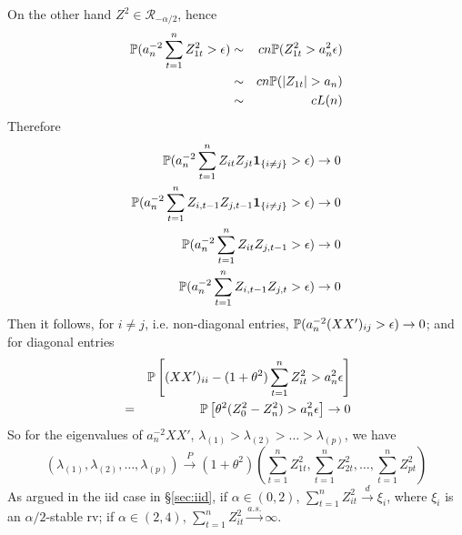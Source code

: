 \documentclass{article}
\begin{document}
On the other hand $Z^2 \in \mathcal R_{-\alpha/2}$, hence
\begin{eqnarray*}
  \mathbb{P}(a_n^{-2} \sum_{t=1}^n Z_{1t}^2 > \epsilon) &\sim& c n
  \mathbb{P}(Z_{1t}^2 > a_n^2 \epsilon) \\
  &\sim& c n \mathbb{P}(|Z_{1t}| > a_n) \\
  &\sim& c L(n)
\end{eqnarray*}
Therefore
\begin{eqnarray*}
  \mathbb{P}(a_n^{-2} \sum_{t=1}^n Z_{it} Z_{jt}\mathbf{1}_{\{i \neq j\}} > \epsilon) \to
  0 \\
  \mathbb{P}(a_n^{-2} \sum_{t=1}^n Z_{i,t-1} Z_{j,t-1} \mathbf{1}_{\{i \neq j\}} >
  \epsilon) \to 0 \\
  \mathbb{P}(a_n^{-2} \sum_{t=1}^n Z_{it} Z_{j,t-1} > \epsilon) \to 0
  \\
  \mathbb{P}(a_n^{-2} \sum_{t=1}^n Z_{i, t-1} Z_{j,t} > \epsilon) \to 0
\end{eqnarray*}
Then it follows, for $i \neq j$, i.e. non-diagonal entries,
$\mathbb{P}(a_n^{-2} (XX')_{ij} > \epsilon) \to 0$; and for diagonal entries
\begin{eqnarray*}
  && \mathbb{P}\left[(XX')_{ii} - (1 + \theta^2)\sum_{t=1}^n
      Z_{it}^2 > a_n^{2} \epsilon \right] \\
  &=& \mathbb{P}\left[\theta^2 ( Z_{0}^2-Z_{n}^2) > a_n^{2} \epsilon
  \right] \to 0\\
\end{eqnarray*}
So for the eigenvalues of $a_n^{-2}XX'$, $\lambda_{(1)} > \lambda_{(2)} >
\dots > \lambda_{(p)}$, we have
\[
(\lambda_{(1)}, \lambda_{(2)}, \dots, \lambda_{(p)}) \xrightarrow{P}
(1+\theta^2)(\sum_{t=1}^n Z_{1t}^2, \sum_{t=1}^n Z_{2t}^2, \dots,
\sum_{t=1}^n Z_{pt}^2)
\]
As argued in the iid case in \S\ref{sec:iid}, if $\alpha \in (0,2)$,
$\sum_{t=1}^n Z_{it}^2 \xrightarrow{d} \xi_{i}$, where $\xi_{i}$ is an
$\alpha/2$-stable rv; if $\alpha \in (2,4)$, $\sum_{t=1}^n Z_{it}^2
\xrightarrow{a.s.} \infty$.
\end{document}
